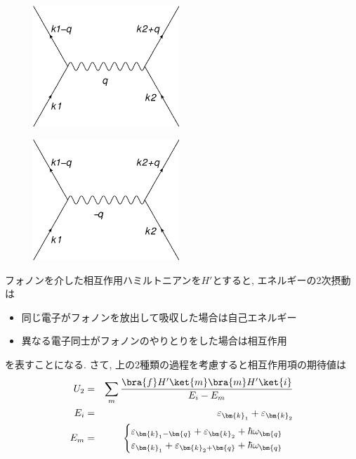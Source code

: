 \documentclass[10.5pt,a4paper]{jreport}
\begin{document}
\begin{figure}[htbp]
  \begin{minipage}{0.5\hsize}
    \centering
    \includegraphics[width = 5.5cm]{./EPS/newdiagram1.eps}
    \label{diagram1}
  \end{minipage}
  \begin{minipage}{0.5\hsize}
    \centering
    \includegraphics[width = 5.5cm]{./EPS/newdiagram2.eps}
    \label{diagram2}
  \end{minipage}
\end{figure}
フォノンを介した相互作用ハミルトニアンを$H'$とすると, エネルギーの2次摂動は
\begin{itemize}
\item 同じ電子がフォノンを放出して吸収した場合は自己エネルギー
\item 異なる電子同士がフォノンのやりとりをした場合は相互作用
\end{itemize}
を表すことになる. さて, 上の2種類の過程を考慮すると相互作用項の期待値は
\begin{eqnarray}
  U_2 &=& \sum_m\frac{\bra{f}H'\ket{m}\bra{m}H'\ket{i}}{E_i-E_m}\\
  E_i &=& \varepsilon_{\bm{k}_1} +\varepsilon_{\bm{k}_2}\\
  E_m &=&
  \begin{cases}
    \varepsilon_{\bm{k}_1 - \bm{q}} +\varepsilon_{\bm{k}_2} + \hbar\omega_{\bm{q}}\\
    \varepsilon_{\bm{k}_1} +\varepsilon_{\bm{k}_2 + \bm{q}} + \hbar\omega_{\bm{q}}
  \end{cases}
\end{eqnarray}
\end{document}
